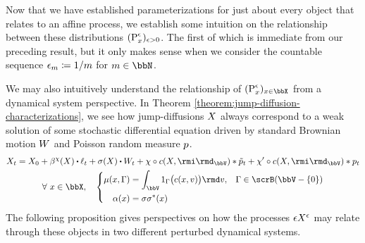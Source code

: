 

Now that we have established parameterizations for just about every object that relates to an affine process, we establish some intuition on the relationship between these distributions $({\operatorname{P}}^\epsilon_x)_{\epsilon>0}$.
The first of which is immediate from our preceding result, but it only makes sense when we consider the countable sequence $\epsilon_m \coloneqq 1/m$ for $m \in \bbN$.



We may also intuitively understand the relationship of $(\Prb^\epsilon_\stateVar)_{\stateVar\in\stateSpace}$ from a dynamical system perspective.
In Theorem \ref{theorem:jump-diffusion-characterizations}, we see how jump-diffusions $X$ always correspond to a weak solution of some stochastic differential equation driven by standard Brownian motion $W$ and Poisson random measure $p$.
\begin{equation}
  \label{eq:sde-reminder}
  \begin{gathered}
    \X_t = \X_0 + \affDrift^\trunc(\X) \shortInt \leb_t + \affDiffSqrt(\X) \shortInt \W_t + \trunc \circ \thinner(\X, \id_\vecSpace) \ast \compensate{\poisRM}_t  + \trunc' \circ \thinner(\X, \id_\vecSpace) \ast \poisRM_t \\
    \forall ~ \stateVar \in \stateSpace, \quad \left\{\begin{aligned}
      \affJump(\stateVar, \Gamma) &= \int_\vecSpace 1_\Gamma\big(\thinner(\stateVar, \markVar)\big) \rmd\markVar, & \Gamma \in \scrB(\vecSpace-\{0\}) \\
      \affDiff(\stateVar) &= \affDiffSqrt\affDiffSqrt^*(\stateVar)
    \end{aligned}\right.
  \end{gathered}
\end{equation}
The following proposition gives perspectives on how the processes $\epsilon X^\epsilon$ may relate through these objects in two different perturbed dynamical systems.




